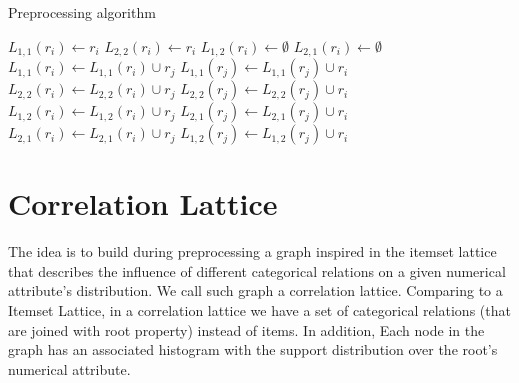 \begin{algorithm}[h!]
  \caption{Preprocessing algorithm}
  \label{alg3}

     {
      $L_{1,1}(r_i) \leftarrow r_i$ \;
      $L_{2,2}(r_i) \leftarrow r_i$ \;
      $L_{1,2}(r_i) \leftarrow \emptyset$ \;
      $L_{2,1}(r_i) \leftarrow \emptyset$ \;
    }
     {
	 {
	     {
		 {
		    $L_{1,1}(r_i) \leftarrow L_{1,1}(r_i) \cup r_j$ \;
		    $L_{1,1}(r_j) \leftarrow L_{1,1}(r_j) \cup r_i$ \;
		}
		 {
		    $L_{2,2}(r_i) \leftarrow L_{2,2}(r_i) \cup r_j$ \;
		    $L_{2,2}(r_j) \leftarrow L_{2,2}(r_j) \cup r_i$ \;
		}
	    }
	     {
		$L_{1,2}(r_i) \leftarrow L_{1,2}(r_i) \cup r_j$ \;
		$L_{2,1}(r_j) \leftarrow L_{2,1}(r_j) \cup r_i$ \;
	    }
	     {
		$L_{2,1}(r_i) \leftarrow L_{2,1}(r_i) \cup r_j$ \;
		$L_{1,2}(r_j) \leftarrow L_{1,2}(r_j) \cup r_i$ \;
	    }
	}
   }
\end{algorithm}

\subsection{}

\section{Correlation Lattice}
\label{ch:lattice}

The idea is to build during preprocessing a graph inspired in the itemset lattice that describes the influence of
different categorical relations on a given numerical attribute's distribution. We call such graph a correlation lattice.
Comparing to a Itemset Lattice, in a correlation lattice we have a set of categorical relations (that are joined with
root property) instead of items. In addition, Each node in the graph has an associated histogram with the support
distribution over the root's numerical attribute.


